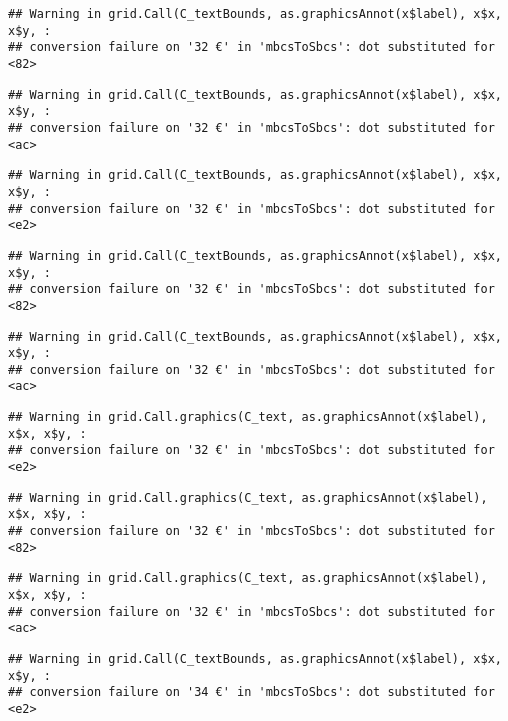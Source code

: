 \documentclass[
]{article}
\begin{document}
\begin{verbatim}
## Warning in grid.Call(C_textBounds, as.graphicsAnnot(x$label), x$x, x$y, :
## conversion failure on '32 €' in 'mbcsToSbcs': dot substituted for <82>
\end{verbatim}

\begin{verbatim}
## Warning in grid.Call(C_textBounds, as.graphicsAnnot(x$label), x$x, x$y, :
## conversion failure on '32 €' in 'mbcsToSbcs': dot substituted for <ac>
\end{verbatim}

\begin{verbatim}
## Warning in grid.Call(C_textBounds, as.graphicsAnnot(x$label), x$x, x$y, :
## conversion failure on '32 €' in 'mbcsToSbcs': dot substituted for <e2>
\end{verbatim}

\begin{verbatim}
## Warning in grid.Call(C_textBounds, as.graphicsAnnot(x$label), x$x, x$y, :
## conversion failure on '32 €' in 'mbcsToSbcs': dot substituted for <82>
\end{verbatim}

\begin{verbatim}
## Warning in grid.Call(C_textBounds, as.graphicsAnnot(x$label), x$x, x$y, :
## conversion failure on '32 €' in 'mbcsToSbcs': dot substituted for <ac>
\end{verbatim}

\begin{verbatim}
## Warning in grid.Call.graphics(C_text, as.graphicsAnnot(x$label), x$x, x$y, :
## conversion failure on '32 €' in 'mbcsToSbcs': dot substituted for <e2>
\end{verbatim}

\begin{verbatim}
## Warning in grid.Call.graphics(C_text, as.graphicsAnnot(x$label), x$x, x$y, :
## conversion failure on '32 €' in 'mbcsToSbcs': dot substituted for <82>
\end{verbatim}

\begin{verbatim}
## Warning in grid.Call.graphics(C_text, as.graphicsAnnot(x$label), x$x, x$y, :
## conversion failure on '32 €' in 'mbcsToSbcs': dot substituted for <ac>
\end{verbatim}

\begin{verbatim}
## Warning in grid.Call(C_textBounds, as.graphicsAnnot(x$label), x$x, x$y, :
## conversion failure on '34 €' in 'mbcsToSbcs': dot substituted for <e2>
\end{verbatim}
\end{document}
